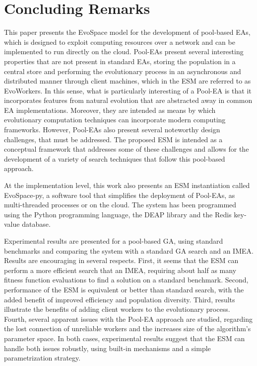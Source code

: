

\section{Concluding Remarks}
\label{sec:conclusions}
This paper presents the EvoSpace model for the development of pool-based EAs, which is designed to exploit computing resources over a network and can be implemented to run directly on the cloud.
Pool-EAs present several interesting properties that are not present in standard EAs, storing the population in a central store and
performing the evolutionary process in an asynchronous and distributed manner through client machines,
which in the ESM are referred to as EvoWorkers.
In this sense, what is particularly interesting of a Pool-EA is that it incorporates features from natural evolution that are abstracted away in common EA implementations.
Moreover, they are intended as means by which evolutionary computation techniques can incorporate modern computing frameworks.
However, Pool-EAs also present several noteworthy design challenges, that must be addressed.
The proposed ESM is intended as a conceptual framework that addresses some of these challenges and allows for the development of a variety of search techniques
that follow this pool-based approach.

At the implementation level, this work also presents an ESM instantiation called EvoSpace-py, a software tool that simplifies the deployment of Pool-EAs,
as multi-threaded processes or on the cloud.
The system has been programmed using the Python programming language, the DEAP library and the Redis key-value database.

Experimental results are presented for a pool-based GA, using standard benchmarks and comparing the system with a standard GA search and an IMEA.
Results are encouraging in several respects.
First, it seems that the ESM can perform a more efficient search that an IMEA, requiring about half as many fitness function evaluations to find
a solution on a standard benchmark.
Second, performance of the ESM is equivalent or better than standard search, with the added benefit of improved efficiency
and population diversity.
Third, results illustrate the benefits of adding client workers to the evolutionary process.
Fourth, several apparent issues with the Pool-EA approach are studied, regarding the lost connection of unreliable workers and the increases size of the algorithm's parameter space.
In both cases, experimental results suggest that the ESM can handle both issues robustly, using built-in mechanisms and a simple
parametrization strategy.


